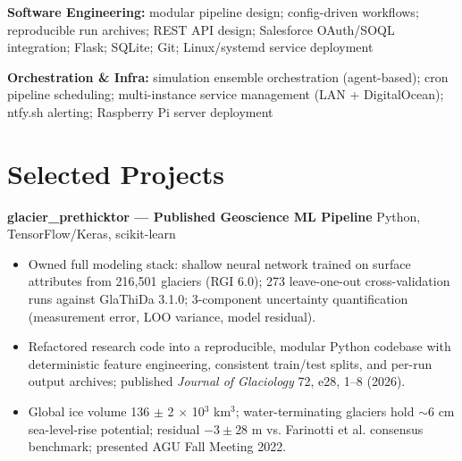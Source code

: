 \documentclass[11pt,a4paper]{article}
\begin{document}
\noindent
\textbf{Software Engineering:} modular pipeline design; config-driven workflows; reproducible run archives; REST API design; Salesforce OAuth/SOQL integration; Flask; SQLite; Git; Linux/systemd service deployment

\noindent
\textbf{Orchestration \& Infra:} simulation ensemble orchestration (agent-based); cron pipeline scheduling; multi-instance service management (LAN + DigitalOcean); ntfy.sh alerting; Raspberry Pi server deployment

\section*{Selected Projects}

\noindent
\textbf{glacier\_prethicktor --- Published Geoscience ML Pipeline} \hfill Python, TensorFlow/Keras, scikit-learn
\begin{itemize}
    \item Owned full modeling stack: shallow neural network trained on surface attributes from 216,501 glaciers (RGI 6.0); 273 leave-one-out cross-validation runs against GlaThiDa 3.1.0; 3-component uncertainty quantification (measurement error, LOO variance, model residual).
    \item Refactored research code into a reproducible, modular Python codebase with deterministic feature engineering, consistent train/test splits, and per-run output archives; published \textit{Journal of Glaciology} 72, e28, 1--8 (2026).
    \item Global ice volume 136 $\pm$ 2 $\times$ 10$^3$ km$^3$; water-terminating glaciers hold $\sim$6 cm sea-level-rise potential; residual $-3 \pm 28$ m vs. Farinotti et al. consensus benchmark; presented AGU Fall Meeting 2022.
\end{itemize}
\end{document}
